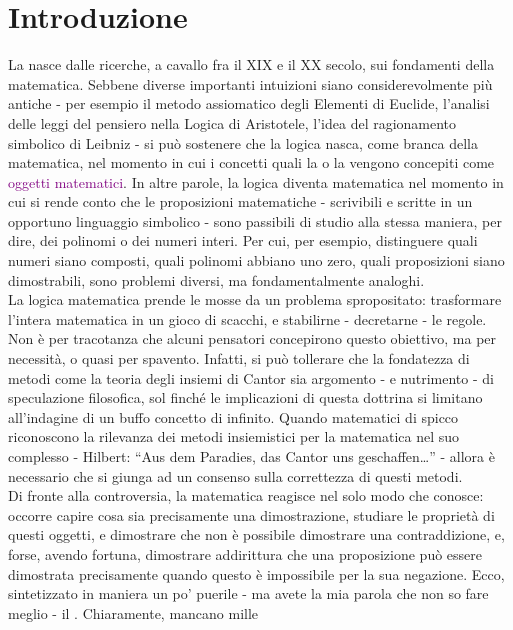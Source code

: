 \section{Introduzione}
La  nasce dalle ricerche, a cavallo fra il XIX e il XX secolo, sui fondamenti della matematica. Sebbene diverse importanti intuizioni siano considerevolmente più antiche - per esempio il 
metodo assiomatico degli Elementi di Euclide, l'analisi delle leggi del pensiero nella Logica di Aristotele, l'idea del ragionamento simbolico di Leibniz - si può sostenere che la logica nasca, come branca della matematica, nel momento 
in cui i concetti quali la  o la  vengono concepiti come \textcolor{purple}{oggetti matematici}. In altre parole, la logica diventa matematica nel momento in cui si rende conto che 
le proposizioni matematiche - scrivibili e scritte in un opportuno linguaggio simbolico - sono passibili di studio alla stessa maniera, per dire, dei polinomi o dei numeri interi. Per cui, per esempio,
distinguere quali numeri siano composti, quali polinomi abbiano uno zero, quali proposizioni siano dimostrabili, sono problemi diversi, ma fondamentalmente analoghi.\\
La logica matematica prende le mosse da un problema spropositato: trasformare l'intera matematica in un gioco di scacchi, e stabilirne - decretarne - le regole. Non è per tracotanza che alcuni pensatori concepirono questo obiettivo, ma per necessità, o quasi per spavento.
Infatti, si può tollerare che la fondatezza  di metodi come la teoria degli insiemi di Cantor sia argomento - e nutrimento - di speculazione filosofica, sol finché le implicazioni di questa dottrina si limitano all'indagine di un buffo concetto di infinito.
Quando matematici di spicco riconoscono la rilevanza dei metodi insiemistici per la matematica nel suo complesso - Hilbert: ``Aus dem Paradies, das Cantor uns geschaffen\ldots'' - allora è necessario che si giunga ad un consenso sulla correttezza di questi metodi.\\
Di fronte alla controversia, la matematica reagisce nel solo modo che conosce: occorre capire cosa sia precisamente una dimostrazione, studiare le proprietà di questi oggetti, e dimostrare che non è possibile dimostrare una contraddizione, e, forse, avendo fortuna, 
dimostrare addirittura che una proposizione può essere dimostrata precisamente quando questo è impossibile per la sua negazione. Ecco, sintetizzato in maniera un po' puerile - ma avete la mia parola che non so fare meglio - il . Chiaramente, mancano mille
